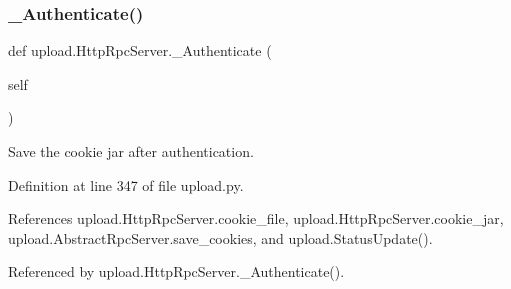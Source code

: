 \subsubsection{\texorpdfstring{\+\_\+\+Authenticate()}{\_Authenticate()}\hspace{0.1cm}{\footnotesize\ttfamily [1/2]}}
{\footnotesize\ttfamily def upload.\+Http\+Rpc\+Server.\+\_\+\+Authenticate (\begin{DoxyParamCaption}\item[{}]{self }\end{DoxyParamCaption})\hspace{0.3cm}{\ttfamily [private]}}

\begin{DoxyVerb}Save the cookie jar after authentication.\end{DoxyVerb}
 

Definition at line 347 of file upload.\+py.



References upload.\+Http\+Rpc\+Server.\+cookie\+\_\+file, upload.\+Http\+Rpc\+Server.\+cookie\+\_\+jar, upload.\+Abstract\+Rpc\+Server.\+save\+\_\+cookies, and upload.\+Status\+Update().



Referenced by upload.\+Http\+Rpc\+Server.\+\_\+\+Authenticate().


